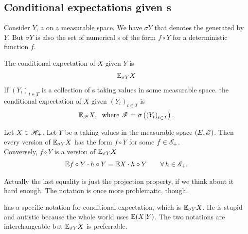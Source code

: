\documentclass{report}
\begin{document}
\subsection{Conditional expectations given \rv s}
Consider $Y$, a \rv{} on a measurable space. We have $\sigma Y$ that denotes the \sa{} generated by $Y$. But $\sigma Y$ is also the set of numerical \rv s of the form $f\circ Y$ for a deterministic function $f$. 
\begin{definition}
	The conditional expectation of $X$ given $Y$ is
\[\mathbb{E}_{\sigma Y} X\]
If ${(Y_{t})}_{t\in T}$ is a collection of \rv s taking values in some measurable space. the conditional expectation of $X$ given ${(Y_{t})}_{t\in T}$ is
\[\mathbb{E}_{\mathscr{F}} X,\;\text{ where }\mathscr{F}=\sigma\left({(Y_{t})}_{t\in T}\right).\]
\end{definition}
\begin{theorem}
	Let $X\in\mathscr{H}_+$. Let $Y$ be a \rv{} taking values in the measurable space $(E,\mathscr{E})$. Then every version of $\mathbb{E}_{\sigma Y} X$ has the form $f\circ Y$ for some $f\in\mathscr{E}_+$.\\
	Conversely, $f\circ Y$ is a version of $\mathbb{E}_{\sigma Y}X$ \ifonly{} 
	\[\mathbb{E} f\circ Y\cdot h\circ Y=\mathbb{E} X\cdot h\circ Y\qquad\forall\, h\in\mathscr{E}_+.\]
\end{theorem}
Actually the last equality is just the projection property, if we think about it hard enough. The notation is once more problematic, though.
\begin{notation}
	\cinlar has a specific notation for conditional expectation, which is $\mathbb{E}_{\sigma Y}X$. He is stupid and autistic because the whole world uses $\mathbb{E}(X|Y)$. The two notations are interchangeable but $\mathbb{E}_{\sigma Y}X$ is preferrable.
\end{notation}
\end{document}
